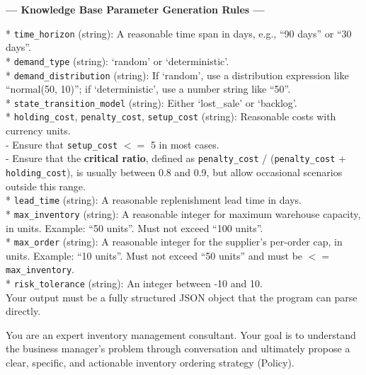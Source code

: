 \documentclass[mnsc,nonblindrev]{informs3_hide}
\begin{document}
\begin{APPENDICES}
\begin{table}[h]
\begin{tcolorbox}
    \textbf{--- Knowledge Base Parameter Generation Rules ---}

    * \texttt{time\_horizon} (string): A reasonable time span in days, e.g., ``90 days'' or ``30 days''. \\
    * \texttt{demand\_type} (string): `random' or `deterministic'. \\
    * \texttt{demand\_distribution} (string): If `random', use a distribution expression like ``normal(50, 10)''; if `deterministic', use a number string like ``50''. \\
    * \texttt{state\_transition\_model} (string): Either `lost\_sale' or `backlog'. \\
    * \texttt{holding\_cost}, \texttt{penalty\_cost}, \texttt{setup\_cost} (string): Reasonable costs with currency units. \\
    \hspace*{1em} - Ensure that \texttt{setup\_cost} $<=$ 5 in most cases. \\
    \hspace*{1em} - Ensure that the \textbf{critical ratio}, defined as \texttt{penalty\_cost} / (\texttt{penalty\_cost} + \texttt{holding\_cost}), is usually between 0.8 and 0.9, but allow occasional scenarios outside this range. \\
    * \texttt{lead\_time} (string): A reasonable replenishment lead time in days. \\
    * \texttt{max\_inventory} (string): A reasonable integer for maximum warehouse capacity, in units. Example: ``50 units''. Must not exceed ``100 units''. \\
    * \texttt{max\_order} (string): A reasonable integer for the supplier’s per-order cap, in units. Example: ``10 units''. Must not exceed ``50 units'' and must be $<=$ \texttt{max\_inventory}. \\
    * \texttt{risk\_tolerance} (string): An integer between -10 and 10.\\[0pt]

    Your output must be a fully structured JSON object that the program can parse directly.
    \end{tcolorbox}
    \caption{System prompt for Problem Generator Agent}
    \label{tab:system_prompt_problem_generator}
\end{table}

\begin{table}[h]
    \begin{tcolorbox}
    \scriptsize
    You are an expert inventory management consultant. Your goal is to understand
    the business manager's problem through conversation and ultimately propose a
    clear, specific, and actionable inventory ordering strategy (Policy).\\


\end{tcolorbox}
\end{table}
\end{APPENDICES}
\end{document}
